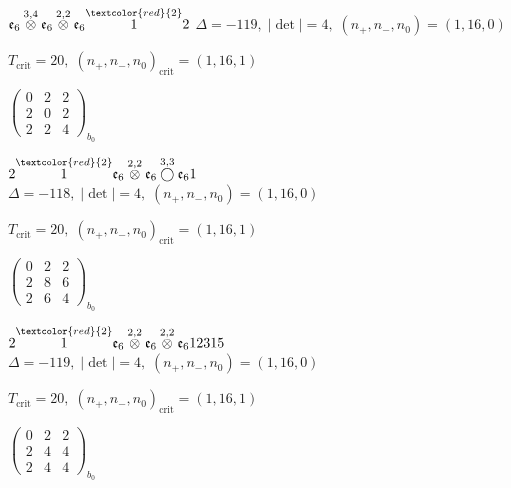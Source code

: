 \documentclass[10pt]{article}
\begin{document}
\smallskip

$\mathfrak{e}_6\overset{3,4}{\otimes}\mathfrak{e}_6\overset{2,2}{\otimes}\mathfrak{e}_6\overset{\textcolor{red}{2}}{1}2$ \quad $\Delta=-119,\; |\det|=4,\; (n_+,n_-,n_0)=(1,16,0)$

\hspace{1em}$T_{\text{crit}}=20,\; (n_+,n_-,n_0)_{\text{crit}}=(1,16,1)$

\hspace{2em}$\left(\begin{smallmatrix}0 & 2 & 2 \\ 2 & 0 & 2 \\ 2 & 2 & 4\end{smallmatrix}\right)_{\!b_0}$

\smallskip

$2\overset{\textcolor{red}{2}}{1}\mathfrak{e}_6\overset{2,2}{\otimes}\mathfrak{e}_6\overset{3,3}{\bigcirc}\mathfrak{e}_61$ \quad $\Delta=-118,\; |\det|=4,\; (n_+,n_-,n_0)=(1,16,0)$

\hspace{1em}$T_{\text{crit}}=20,\; (n_+,n_-,n_0)_{\text{crit}}=(1,16,1)$

\hspace{2em}$\left(\begin{smallmatrix}0 & 2 & 2 \\ 2 & 8 & 6 \\ 2 & 6 & 4\end{smallmatrix}\right)_{\!b_0}$

\smallskip

$2\overset{\textcolor{red}{2}}{1}\mathfrak{e}_6\overset{2,2}{\otimes}\mathfrak{e}_6\overset{2,2}{\otimes}\mathfrak{e}_612315$ \quad $\Delta=-119,\; |\det|=4,\; (n_+,n_-,n_0)=(1,16,0)$

\hspace{1em}$T_{\text{crit}}=20,\; (n_+,n_-,n_0)_{\text{crit}}=(1,16,1)$

\hspace{2em}$\left(\begin{smallmatrix}0 & 2 & 2 \\ 2 & 4 & 4 \\ 2 & 4 & 4\end{smallmatrix}\right)_{\!b_0}$
\end{document}
